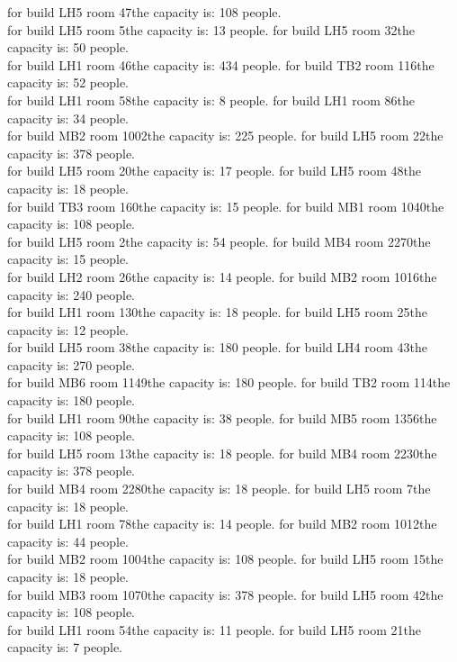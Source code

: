 for build LH5 room 47the capacity is: 108 people.\\
for build LH5 room 5the capacity is: 13 people.
for build LH5 room 32the capacity is: 50 people.\\
for build LH1 room 46the capacity is: 434 people.
for build TB2 room 116the capacity is: 52 people.\\
for build LH1 room 58the capacity is: 8 people.
for build LH1 room 86the capacity is: 34 people.\\
for build MB2 room 1002the capacity is: 225 people.
for build LH5 room 22the capacity is: 378 people.\\
for build LH5 room 20the capacity is: 17 people.
for build LH5 room 48the capacity is: 18 people.\\
for build TB3 room 160the capacity is: 15 people.
for build MB1 room 1040the capacity is: 108 people.\\
for build LH5 room 2the capacity is: 54 people.
for build MB4 room 2270the capacity is: 15 people.\\
for build LH2 room 26the capacity is: 14 people.
for build MB2 room 1016the capacity is: 240 people.\\
for build LH1 room 130the capacity is: 18 people.
for build LH5 room 25the capacity is: 12 people.\\
for build LH5 room 38the capacity is: 180 people.
for build LH4 room 43the capacity is: 270 people.\\
for build MB6 room 1149the capacity is: 180 people.
for build TB2 room 114the capacity is: 180 people.\\
for build LH1 room 90the capacity is: 38 people.
for build MB5 room 1356the capacity is: 108 people.\\
for build LH5 room 13the capacity is: 18 people.
for build MB4 room 2230the capacity is: 378 people.\\
for build MB4 room 2280the capacity is: 18 people.
for build LH5 room 7the capacity is: 18 people.\\
for build LH1 room 78the capacity is: 14 people.
for build MB2 room 1012the capacity is: 44 people.\\
for build MB2 room 1004the capacity is: 108 people.
for build LH5 room 15the capacity is: 18 people.\\
for build MB3 room 1070the capacity is: 378 people.
for build LH5 room 42the capacity is: 108 people.\\
for build LH1 room 54the capacity is: 11 people.
for build LH5 room 21the capacity is: 7 people.\\
